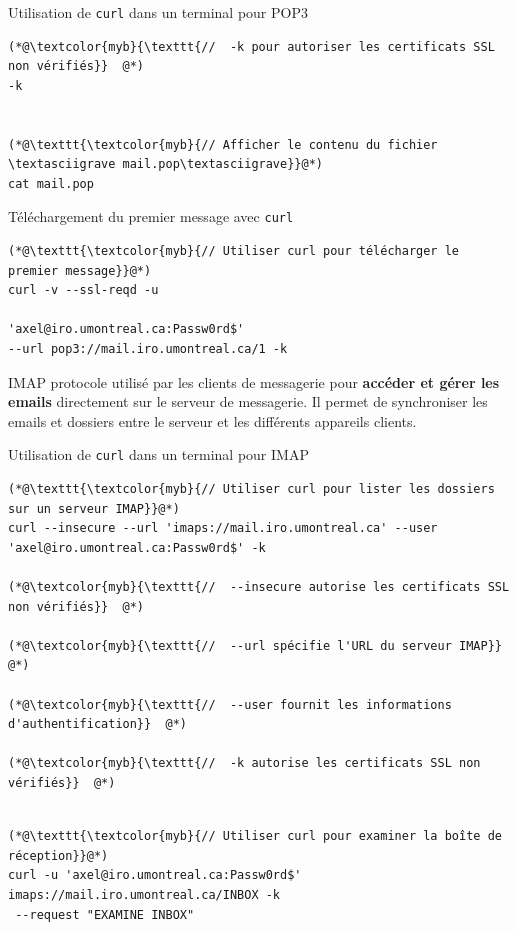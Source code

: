 \documentclass{report}
\begin{document}
\begin{multicols*}{3}
\begin{EExample}{Utilisation de \texttt{curl} dans un terminal pour POP3}{}
\begin{lstlisting}
(*@\textcolor{myb}{\texttt{//  -k pour autoriser les certificats SSL non vérifiés}}  @*)
-k


(*@\texttt{\textcolor{myb}{// Afficher le contenu du fichier \textasciigrave mail.pop\textasciigrave}}@*)
cat mail.pop
\end{lstlisting}
\end{EExample}

\begin{EExample}{Téléchargement du premier message avec \texttt{curl}}{}
    \begin{lstlisting}
(*@\texttt{\textcolor{myb}{// Utiliser curl pour télécharger le premier message}}@*)
curl -v --ssl-reqd -u    

'axel@iro.umontreal.ca:Passw0rd$' 
--url pop3://mail.iro.umontreal.ca/1 -k
    \end{lstlisting}
\end{EExample}

\begin{Definitionx}{IMAP}{}
    protocole utilisé par les clients de messagerie pour \textbf{accéder et gérer les emails} 
    directement sur le serveur de messagerie. Il permet de synchroniser les emails et dossiers 
    entre le serveur et les différents appareils clients.
\end{Definitionx}

\begin{EExample}{Utilisation de \texttt{curl} dans un terminal pour IMAP}{}
\begin{lstlisting}
(*@\texttt{\textcolor{myb}{// Utiliser curl pour lister les dossiers sur un serveur IMAP}}@*)
curl --insecure --url 'imaps://mail.iro.umontreal.ca' --user 'axel@iro.umontreal.ca:Passw0rd$' -k

(*@\textcolor{myb}{\texttt{//  --insecure autorise les certificats SSL non vérifiés}}  @*)

(*@\textcolor{myb}{\texttt{//  --url spécifie l'URL du serveur IMAP}}  @*)

(*@\textcolor{myb}{\texttt{//  --user fournit les informations d'authentification}}  @*)

(*@\textcolor{myb}{\texttt{//  -k autorise les certificats SSL non vérifiés}}  @*)
\end{lstlisting}

    \begin{lstlisting}

(*@\texttt{\textcolor{myb}{// Utiliser curl pour examiner la boîte de réception}}@*)
curl -u 'axel@iro.umontreal.ca:Passw0rd$' imaps://mail.iro.umontreal.ca/INBOX -k
 --request "EXAMINE INBOX"


\end{lstlisting}
\end{EExample}
\end{multicols*}
\end{document}
